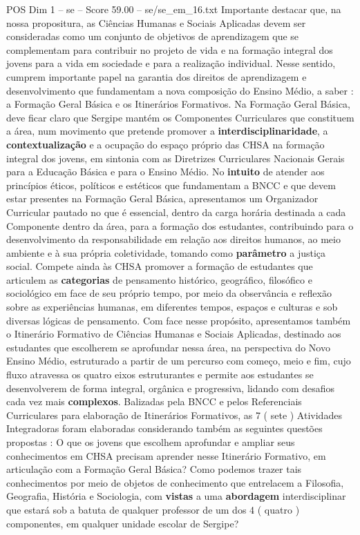 \begin{textsample}{POS Dim 1 – se – Score 59.00 – se/se\_em\_16.txt}
Importante destacar que, na nossa propositura, as Ciências Humanas e Sociais Aplicadas devem ser consideradas como um conjunto de objetivos de aprendizagem que se complementam para contribuir no projeto de vida e na formação integral dos jovens para a vida em sociedade e para a realização individual.
Nesse sentido, cumprem importante papel na garantia dos direitos de aprendizagem e desenvolvimento que fundamentam a nova composição do Ensino Médio, a saber : a Formação Geral Básica e os Itinerários Formativos.
Na Formação Geral Básica, deve ficar claro que Sergipe mantém os Componentes Curriculares que constituem a área, num movimento que pretende promover a \textbf{interdisciplinaridade}, a \textbf{contextualização} e a ocupação do espaço próprio das CHSA na formação integral dos jovens, em sintonia com as Diretrizes Curriculares Nacionais Gerais para a Educação Básica e para o Ensino Médio.
No \textbf{intuito} de atender aos princípios éticos, políticos e estéticos que fundamentam a BNCC e que devem estar presentes na Formação Geral Básica, apresentamos um Organizador Curricular pautado no que é essencial, dentro da carga horária destinada a cada Componente dentro da área, para a formação dos estudantes, contribuindo para o desenvolvimento da responsabilidade em relação aos direitos humanos, ao meio ambiente e à sua própria coletividade, tomando como \textbf{parâmetro} a justiça social.
Compete ainda às CHSA promover a formação de estudantes que articulem as \textbf{categorias} de pensamento histórico, geográfico, filosófico e sociológico em face de seu próprio tempo, por meio da observância e reflexão sobre as experiências humanas, em diferentes tempos, espaços e culturas e sob diversas lógicas de pensamento.
Com face nesse propósito, apresentamos também o Itinerário Formativo de Ciências Humanas e Sociais Aplicadas, destinado aos estudantes que escolherem se aprofundar nessa área, na perspectiva do Novo Ensino Médio, estruturado a partir de um percurso com começo, meio e fim, cujo fluxo atravessa os quatro eixos estruturantes e permite aos estudantes se desenvolverem de forma integral, orgânica e progressiva, lidando com desafios cada vez mais \textbf{complexos}.
Balizadas pela BNCC e pelos Referenciais Curriculares para elaboração de Itinerários Formativos, as 7 ( sete ) Atividades Integradoras foram elaboradas considerando também as seguintes questões propostas : O que os jovens que escolhem aprofundar e ampliar seus conhecimentos em CHSA precisam aprender nesse Itinerário Formativo, em articulação com a Formação Geral Básica?
Como podemos trazer tais conhecimentos por meio de objetos de conhecimento que entrelacem a Filosofia, Geografia, História e Sociologia, com \textbf{vistas} a uma \textbf{abordagem} interdisciplinar que estará sob a batuta de qualquer professor de um dos 4 ( quatro ) componentes, em qualquer unidade escolar de Sergipe?

\end{textsample}
